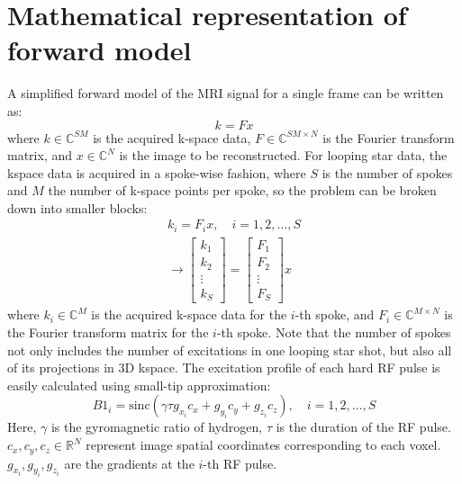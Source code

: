 \documentclass[11pt]{article}
\begin{document}
\section*{Mathematical representation of forward model}
A simplified forward model of the MRI signal for a single frame can be written as:
\begin{equation}\label{eq:basic_fwd}
  k = Fx
\end{equation}
where $k \in \mathbb{C}^{SM}$ is the acquired k-space data, $F \in \mathbb{C}^{SM \times N}$ is the Fourier transform matrix,
and $x \in \mathbb{C}^{N}$ is the image to be reconstructed.
For looping star data, the kspace data is acquired in a spoke-wise fashion, where $S$ is the number of spokes and $M$ the number of k-space points per spoke,
so the problem can be broken down into smaller blocks:
\begin{equation}\label{eq:spokewise_fwd}
  \begin{aligned}
    k_{i} = F_{i} x, \quad i = 1, 2, \ldots, S \\
    \rightarrow \begin{bmatrix} k_1 \\ k_2 \\ \vdots \\ k_S \end{bmatrix}
     = \begin{bmatrix} F_{1} \\ F_{2} \\ \vdots \\ F_{S} \end{bmatrix} x
  \end{aligned}
\end{equation}
where $k_{i} \in \mathbb{C}^{M}$ is the acquired k-space data for the $i$-th spoke, and $F_{i} \in \mathbb{C}^{M \times N}$ is the Fourier transform matrix for the $i$-th spoke.
Note that the number of spokes not only includes the number of excitations in one looping star shot, but also all of its projections in 3D kspace.
The excitation profile of each hard RF pulse is easily calculated using small-tip approximation:
\begin{equation}
    B1_i = \text{sinc} (\gamma \tau g_{x_i}c_x + g_{y_i}c_y + g_{z_i}c_z), \quad i = 1, 2, \ldots, S
\end{equation}
Here, $\gamma$ is the gyromagnetic ratio of hydrogen, $\tau$ is the duration of the RF pulse.
$c_x, c_y, c_z \in \mathbb{R}^N$ represent image spatial coordinates corresponding to each voxel.
$g_{x_i}, g_{y_i}, g_{z_i}$ are the gradients at the $i$-th RF pulse.
\end{document}
